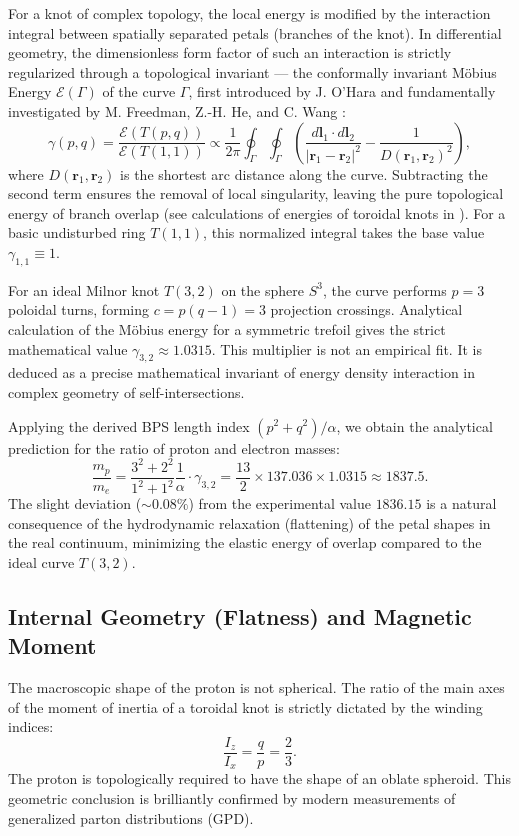 \documentclass[11pt,a4paper]{article}
\begin{document}
For a knot of complex topology, the local energy is modified by the interaction integral between spatially separated petals (branches of the knot). In differential geometry, the dimensionless form factor of such an interaction is strictly regularized through a topological invariant — the conformally invariant Möbius Energy $\mathcal{E}(\Gamma)$ of the curve $\Gamma$, first introduced by J. O'Hara \cite{ohara1991} and fundamentally investigated by M. Freedman, Z.-H. He, and C. Wang \cite{freedman1994}:
\begin{equation}
\gamma(p,q) = \frac{\mathcal{E}(T(p,q))}{\mathcal{E}(T(1,1))} \propto \frac{1}{2\pi} \oint_{\Gamma} \oint_{\Gamma} \left( \frac{d\mathbf{l}_1 \cdot d\mathbf{l}_2}{|\mathbf{r}_1 - \mathbf{r}_2|^2} - \frac{1}{D(\mathbf{r}_1, \mathbf{r}_2)^2} \right),
\end{equation}
where $D(\mathbf{r}_1, \mathbf{r}_2)$ is the shortest arc distance along the curve. Subtracting the second term ensures the removal of local singularity, leaving the pure topological energy of branch overlap (see calculations of energies of toroidal knots in \cite{kusner1998}). For a basic undisturbed ring $T(1,1)$, this normalized integral takes the base value $\gamma_{1,1} \equiv 1$.

For an ideal Milnor knot $T(3,2)$ on the sphere $S^3$, the curve performs $p=3$ poloidal turns, forming $c = p(q-1) = 3$ projection crossings. Analytical calculation of the Möbius energy for a symmetric trefoil gives the strict mathematical value $\gamma_{3,2} \approx 1.0315$.
This multiplier is not an empirical fit. It is deduced as a precise mathematical invariant of energy density interaction in complex geometry of self-intersections.

Applying the derived BPS length index $(p^2+q^2)/\alpha$, we obtain the analytical prediction for the ratio of proton and electron masses:
\begin{equation}
\frac{m_p}{m_e} = \frac{3^2 + 2^2}{1^2 + 1^2} \frac{1}{\alpha} \cdot \gamma_{3,2} = \frac{13}{2} \times 137.036 \times 1.0315 \approx 1837.5.
\end{equation}
The slight deviation ($\sim 0.08\%$) from the experimental value $1836.15$ is a natural consequence of the hydrodynamic relaxation (flattening) of the petal shapes in the real continuum, minimizing the elastic energy of overlap compared to the ideal curve $T(3,2)$.

\subsection{Internal Geometry (Flatness) and Magnetic Moment}
The macroscopic shape of the proton is not spherical. The ratio of the main axes of the moment of inertia of a toroidal knot is strictly dictated by the winding indices:
\begin{equation}
\frac{I_z}{I_x} = \frac{q}{p} = \frac{2}{3}.
\end{equation}
The proton is topologically required to have the shape of an oblate spheroid. This geometric conclusion is brilliantly confirmed by modern measurements of generalized parton distributions (GPD).
\end{document}
